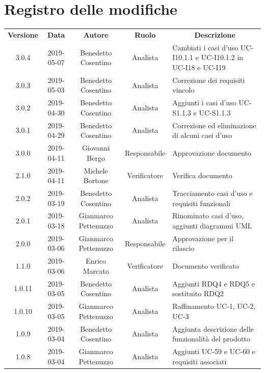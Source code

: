 \documentclass[11pt,a4paper]{article}
\begin{document}
	
	{\def\arraystretch{2}\tabcolsep=10pt
	\newpage
	\section*{\centering Registro delle modifiche}
	\begin{tabularx}{\textwidth}{ c | c | c | c | X }
		\rowcolor{LightBlue}
		\color{white}\bfseries Versione & \color{white}\bfseries Data & \color{white}\bfseries Autore & \color{white}\bfseries Ruolo & \multicolumn{1}{c}{\color{white}\bfseries Descrizione}\\[0.25cm]
		3.0.4 & 2019-05-07 & Benedetto Cosentino & Analista & Cambiati i casi d'uso UC-I10.1.1 e UC-I10.1.2 in UC-I18 e UC-I19\\ \hline
		3.0.3 & 2019-05-03 & Benedetto Cosentino & Analista & Correzione dei requisiti vincolo\\ \hline
		3.0.2 & 2019-04-30 & Benedetto Cosentino & Analista & Aggiunti i casi d'uso UC-S1.1.3 e UC-S1.1.3\\ \hline
		3.0.1 & 2019-04-29 & Benedetto Cosentino & Analista & Correzione ed eliminazione di alcuni casi d'uso\\ \hline
		3.0.0 & 2019-04-11 & Giovanni Bergo & Responsabile & Approvazione documento\\ \hline
		2.1.0 & 2019-04-11 & Michele Bortone & Verificatore & Verifica documento\\ \hline
		2.0.2 & 2019-03-19 & Benedetto Cosentino & Analista & Tracciamento casi d'uso e requisiti funzionali\\ \hline
		2.0.1 & 2019-03-18 & Gianmarco Pettenuzzo & Analista & Rinominato casi d'uso, aggiunti diagrammi UML\\ \hline
		2.0.0 & 2019-03-06 & Gianmarco Pettenuzzo & Responsabile & Approvazione per il rilascio\\ \hline
		1.1.0 & 2019-03-06 & Enrico Marcato & Verificatore & Documento verificato\\ \hline
		1.0.11 & 2019-03-05 & Benedetto Cosentino & Analista & Aggiunti RDQ4 e RDQ5 e sostituito RDQ2\\ \hline
		1.0.10 & 2019-03-05 & Gianmarco Pettenuzzo & Analista & Raffinamento UC-1, UC-2, UC-3 \\ \hline
		1.0.9 & 2019-03-04 & Benedetto Cosentino & Analista & Aggiunta descrizione delle funzionalità del prodotto\\ \hline
		1.0.8 & 2019-03-04 & Gianmarco Pettenuzzo & Analista & Aggiunti UC-59 e UC-60 e requisiti associati \\ \hline

\end{tabularx}}
\end{document}
